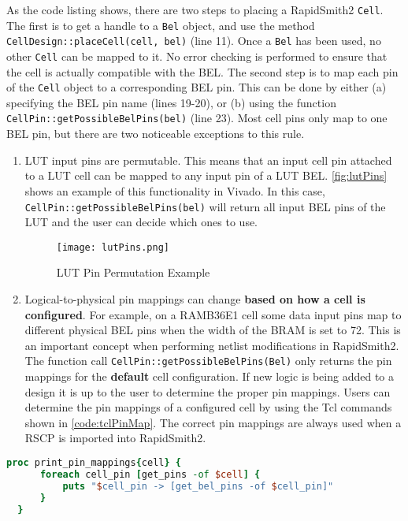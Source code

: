 As the code listing shows, there are two steps to placing a RapidSmith2
\texttt{Cell}. The first is to get a handle to a \texttt{Bel}
object, and use the method \texttt{CellDesign::placeCell(cell, bel)} (line
11). Once a \texttt{Bel} has been used, no other \texttt{Cell} can be mapped to
it. No error checking is performed to ensure that the cell is actually
compatible with the BEL. The second step is to map each pin of the \texttt{Cell}
object to a corresponding BEL pin. This can be done by either (a)
specifying the BEL pin name (lines 19-20), or (b) using the function
\texttt{CellPin::getPossibleBelPins(bel)} (line 23). Most cell pins only map to
one BEL pin, but there are two noticeable exceptions to this rule.

\begin {enumerate}
  \item LUT input pins are permutable. This means that an input cell pin
  attached to a LUT cell can be mapped to any input pin of a LUT BEL.
  \autoref{fig:lutPins} shows an example of this functionality in Vivado. In
  this case,  \texttt{CellPin::get\-PossibleBelPins(bel)} will return
  all input BEL pins of the LUT and the user can decide which ones to
  use.
  
  \begin{figure}[b!]
	\centering
	\texttt{[image: lutPins.png]}
	\caption{LUT Pin Permutation Example}
	\label{fig:lutPins}
  \end{figure}
  
  \item Logical-to-physical pin mappings can change \textbf{based on how a cell
  is configured}. For example, on a RAMB36E1 cell some data input pins map to
  different physical BEL pins when the width of the BRAM is set to 72. This is
  an important concept when performing netlist modifications in RapidSmith2. The
  function call \texttt{CellPin::get\-PossibleBelPins(Bel)} only returns the pin
  mappings for the \textbf{default} cell configuration. If new logic is being
  added to a design it is up to the user to determine the proper pin mappings. 
  Users can determine the pin mappings of a configured cell by using the Tcl
  commands shown in \autoref{code:tclPinMap}. The correct pin mappings are
  always used when a RSCP is imported into RapidSmith2.

\end{enumerate}

\newpage
\begin{lstlisting}[xleftmargin=1.5em, framexleftmargin=1.5em, language=tcl,
caption=Tcl script to print all logical-to-physical pin mappings of a
cell,label=code:tclPinMap] 
  proc print_pin_mappings{cell} {
	  foreach cell_pin [get_pins -of $cell] {
		  puts "$cell_pin -> [get_bel_pins -of $cell_pin]" 
	  }
  }
\end{lstlisting}
 
